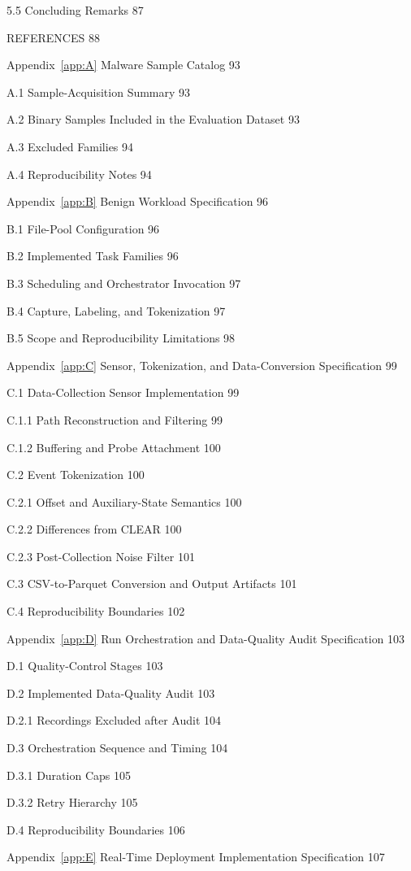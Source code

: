 5.5  Concluding Remarks	87

REFERENCES	88

Appendix~\ref{app:A} Malware Sample Catalog	93

A.1  Sample-Acquisition Summary	93

A.2  Binary Samples Included in the Evaluation Dataset	93

A.3  Excluded Families	94

A.4  Reproducibility Notes	94

Appendix~\ref{app:B} Benign Workload Specification	96

B.1  File-Pool Configuration	96

B.2  Implemented Task Families	96

B.3  Scheduling and Orchestrator Invocation	97

B.4  Capture, Labeling, and Tokenization	97

B.5  Scope and Reproducibility Limitations	98

Appendix~\ref{app:C} Sensor, Tokenization, and Data-Conversion Specification	99

C.1  Data-Collection Sensor Implementation	99

C.1.1  Path Reconstruction and Filtering	99

C.1.2  Buffering and Probe Attachment	100

C.2  Event Tokenization	100

C.2.1  Offset and Auxiliary-State Semantics	100

C.2.2  Differences from CLEAR	100

C.2.3  Post-Collection Noise Filter	101

C.3  CSV-to-Parquet Conversion and Output Artifacts	101

C.4  Reproducibility Boundaries	102

Appendix~\ref{app:D} Run Orchestration and Data-Quality Audit Specification	103

D.1  Quality-Control Stages	103

D.2  Implemented Data-Quality Audit	103

D.2.1  Recordings Excluded after Audit	104

D.3  Orchestration Sequence and Timing	104

D.3.1  Duration Caps	105

D.3.2  Retry Hierarchy	105

D.4  Reproducibility Boundaries	106

Appendix~\ref{app:E} Real-Time Deployment Implementation Specification	107

